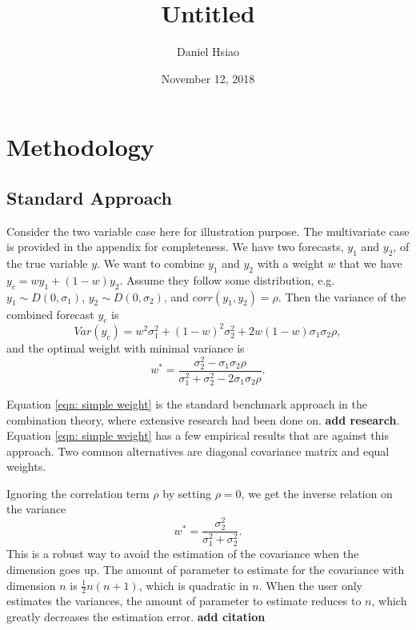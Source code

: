\documentclass[]{article}
\title{Untitled}
\author{Daniel Hsiao}
\date{November 12, 2018}
\begin{document}
\maketitle

{
\setcounter{tocdepth}{3}
\tableofcontents
}
\newpage

\hypertarget{methodology}{%
\section{Methodology}\label{methodology}}

\hypertarget{standard-approach}{%
\subsection{Standard Approach}\label{standard-approach}}

Consider the two variable case here for illustration purpose. The
multivariate case is provided in the appendix for completeness. We have
two forecasts, \(y_1\) and \(y_2\), of the true variable \(y\). We want
to combine \(y_1\) and \(y_2\) with a weight \(w\) that we have
\(y_c = w y_1 + (1-w) y_2\). Assume they follow some distribution, e.g.
\(y_1 \sim D(0,\sigma_1)\), \(y_2 \sim D(0,\sigma_2)\), and
\(corr(y_1,y_2)=\rho\). Then the variance of the combined forecast
\(y_c\) is \begin{equation}
\label{eqn: var yc}
Var(y_c) = w^2\sigma_1^2+ (1-w)^2\sigma_2^2+2w(1-w)\sigma_1\sigma_2\rho,
\end{equation} and the optimal weight with minimal variance is
\begin{equation}
\label{eqn: simple weight}
w^*=\frac{\sigma_2^2-\sigma_1\sigma_2\rho}{\sigma_1^2+\sigma_2^2 -2\sigma_1\sigma_2\rho}.
\end{equation}

Equation \ref{eqn: simple weight} is the standard benchmark approach in
the combination theory, where extensive research had been done on.
\textbf{add research}. Equation \ref{eqn: simple weight} has a few
empirical results that are against this approach. Two common
alternatives are diagonal covariance matrix and equal weights.

Ignoring the correlation term \(\rho\) by setting \(\rho=0\), we get the
inverse relation on the variance \begin{equation}
\label{eqn: simple weight no corr}
w^*=\frac{\sigma_2^2}{\sigma_1^2+\sigma_2^2}.
\end{equation} This is a robust way to avoid the estimation of the
covariance when the dimension goes up. The amount of parameter to
estimate for the covariance with dimension \(n\) is
\(\frac{1}{2}n(n+1)\), which is quadratic in \(n\). When the user only
estimates the variances, the amount of parameter to estimate reduces to
\(n\), which greatly decreases the estimation error. \textbf{add
citation}
\end{document}
